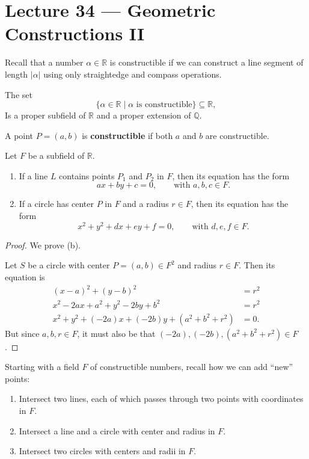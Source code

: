 \section{Lecture 34 — Geometric Constructions II}

Recall that a number $\alpha\in\mathbb R$ is constructible if we can construct a line segment of length $|\alpha|$ using only straightedge and compass operations.

The set
$$\{\alpha\in\mathbb R\mid\text{$\alpha$ is constructible}\}\subseteq\mathbb R,$$
Is a proper subfield of $\mathbb R$ and a proper extension of $\mathbb Q$.

\begin{definition}[constructible]
	A point $P=(a,b)$ is \textbf{constructible} if both $a$ and $b$ are constructible.
\end{definition}

\begin{lemma}
	Let $F$ be a subfield of $\mathbb R$.
	\begin{enumerate}
		\item If a line $L$ contains points $P_1$ and $P_2$ in $F$, then its equation has the form
		$$ax+by+c=0,\qquad\text{with $a,b,c\in F$.}$$
		\item If a circle has center $P$ in $F$ and a radius $r\in F$, then its equation has the form
		$$x^2+y^2+dx+ey+f=0,\qquad\text{with $d,e,f\in F$.}$$
	\end{enumerate}
\end{lemma}

\begin{proof}
	We prove (b).

	Let $S$ be a circle with center $P=(a,b)\in F^2$ and radius $r\in F$. Then its equation is
	\begin{align*}
		(x-a)^2+(y-b)^2&=r^2\\
		x^2-2ax+a^2+y^2-2by+b^2&=r^2\\
		x^2+y^2+(-2a)x+(-2b)y+(a^2+b^2+r^2)&=0.
	\end{align*}
	But since $a,b,r\in F$, it must also be that $(-2a),(-2b),(a^2+b^2+r^2)\in F$.
\end{proof}

Starting with a field $F$ of constructible numbers, recall how we can add ``new'' points:

\begin{enumerate}[label={\color{main}\bfseries\sffamily (\roman*)}]
	\item Intersect two lines, each of which passes through two points with coordinates in $F$.
	\item Intersect a line and a circle with center and radius in $F$.
	\item Intersect two circles with centers and radii in $F$.
\end{enumerate}

